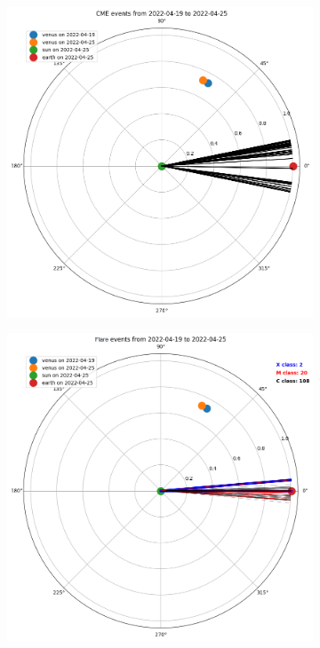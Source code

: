         \begin{figure}[H]
        \centering
        \begin{subfigure}{.47\textwidth}
            \includegraphics[width=\textwidth]{report/Figures/results/cme_loc.png}
        \end{subfigure}%
        \hspace{1em}
        \begin{subfigure}{.47\textwidth}
            \centering
            \includegraphics[width=\textwidth]{report/Figures/results/fl_loc.png}
        \end{subfigure}
        \caption{}
        \label{locator}
        \end{figure}

